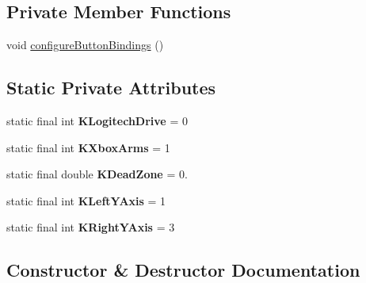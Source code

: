 \subsection*{Private Member Functions}
\begin{DoxyCompactItemize}
\item 
void \mbox{\hyperlink{classfrc_1_1robot_1_1_robot_container_a1660efe4ee6c6282a49820cc74259eb5}{configure\+Button\+Bindings}} ()
\end{DoxyCompactItemize}
\subsection*{Static Private Attributes}
\begin{DoxyCompactItemize}
\item 
\mbox{\label{classfrc_1_1robot_1_1_robot_container_ada5ae12597d2a7e5163078c49a63b61d}} 
static final int {\bfseries K\+Logitech\+Drive} = 0
\item 
\mbox{\label{classfrc_1_1robot_1_1_robot_container_a9765d6a4b63259b3f23626bb8c659d74}} 
static final int {\bfseries K\+Xbox\+Arms} = 1
\item 
\mbox{\label{classfrc_1_1robot_1_1_robot_container_ac22193a55fc85effa99a6730ec5e56df}} 
static final double {\bfseries K\+Dead\+Zone} = 0.
\item 
\mbox{\label{classfrc_1_1robot_1_1_robot_container_a9258cdb994f00aaeaee6db43c41c6047}} 
static final int {\bfseries K\+Left\+Y\+Axis} = 1
\item 
\mbox{\label{classfrc_1_1robot_1_1_robot_container_af4e2b0ccaa9a0f1c54c71ba8ab8b7b2e}} 
static final int {\bfseries K\+Right\+Y\+Axis} = 3
\end{DoxyCompactItemize}


\subsection{Constructor \& Destructor Documentation}
\mbox{\label{classfrc_1_1robot_1_1_robot_container_ab0ea038f5ce3328722a60e0823f51887}} 
